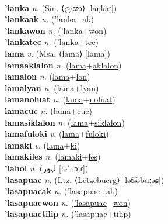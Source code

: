  \label{lanaukiles} \\
\textbf{'lanka} \textit{n.} (Sin. ⟨ලංකා⟩ [laŋkaː])
 \label{'lanka} \\
\textbf{'lankaak} \textit{n.} (\hyperref['lanka]{'lanka}+\hyperref[ak]{ak})
 \label{'lankaak} \\
\textbf{'lankawon} \textit{n.} (\hyperref['lanka]{'lanka}+\hyperref[won]{won})
 \label{'lankawon} \\
\textbf{'lankatec} \textit{n.} (\hyperref['lanka]{'lanka}+\hyperref[tec]{tec})
 \label{'lankatec} \\
\textbf{lama} \textit{v.} (Msa. ⟨lama⟩ [lama])
 \label{lama} \\
\textbf{lamaaklalon} \textit{n.} (\hyperref[lama]{lama}+\hyperref[aklalon]{aklalon})
 \label{lamaaklalon} \\
\textbf{lamalon} \textit{n.} (\hyperref[lama]{lama}+\hyperref[lon]{lon})
 \label{lamalon} \\
\textbf{lamalyan} \textit{n.} (\hyperref[lama]{lama}+\hyperref[lyan]{lyan})
 \label{lamalyan} \\
\textbf{lamanoluat} \textit{n.} (\hyperref[lama]{lama}+\hyperref[noluat]{noluat})
 \label{lamanoluat} \\
\textbf{lamacuc} \textit{n.} (\hyperref[lama]{lama}+\hyperref[cuc]{cuc})
 \label{lamacuc} \\
\textbf{lamasiklalon} \textit{n.} (\hyperref[lama]{lama}+\hyperref[siklalon]{siklalon})
 \label{lamasiklalon} \\
\textbf{lamafuloki} \textit{v.} (\hyperref[lama]{lama}+\hyperref[fuloki]{fuloki})
 \label{lamafuloki} \\
\textbf{lamaki} \textit{v.} (\hyperref[lama]{lama}+\hyperref[ki]{ki})
 \label{lamaki} \\
\textbf{lamakiles} \textit{n.} (\hyperref[lamaki]{lamaki}+\hyperref[les]{les})
 \label{lamakiles} \\
\textbf{'lahol} \textit{n.} ({\gurmukhi{}لہور} [ləˈhɔːɾ])
 \label{'lahol} \\
\textbf{'lasapuac} \textit{n.} (Ltz. ⟨Lëtzebuerg⟩ [lət͡səbuːəɕ])
 \label{'lasapuac} \\
\textbf{'lasapuacak} \textit{n.} (\hyperref['lasapuac]{'lasapuac}+\hyperref[ak]{ak})
 \label{'lasapuacak} \\
\textbf{'lasapuacwon} \textit{n.} (\hyperref['lasapuac]{'lasapuac}+\hyperref[won]{won})
 \label{'lasapuacwon} \\
\textbf{'lasapuactilip} \textit{n.} (\hyperref['lasapuac]{'lasapuac}+\hyperref[tilip]{tilip})
